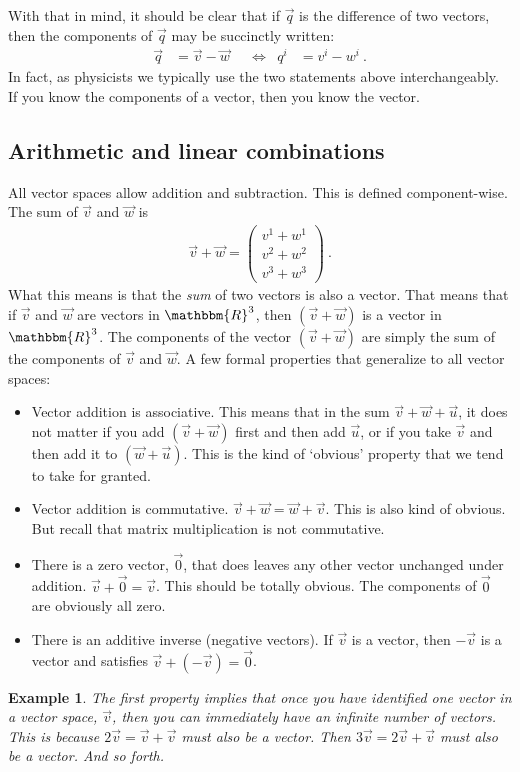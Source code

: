 \documentclass[12pt]{article}
\newtheorem{example}{Example}[section]
\begin{document}
With that in mind, it should be clear that if $\vec{q}$ is the difference of two vectors, then the components of $\vec{q}$ may be succinctly written:
\begin{align}
\vec{q} &= \vec{v}-\vec{w}    
&
&\Leftrightarrow
&
q^i &= v^i - w^i \ .
\end{align}
In fact, as physicists we typically use the two statements above interchangeably. If you know the components of a vector, then you know the vector.



\subsection{Arithmetic and linear combinations}

All vector spaces allow addition and subtraction. This is defined component-wise. The sum of $\vec{v}$ and $\vec{w}$ is
\begin{align}
    \vec{v}+\vec{w} = 
    \begin{pmatrix}
        v^1 + w^1\\
        v^2 + w^2\\
        v^3 + w^3
    \end{pmatrix} \ .
\end{align}
What this means is that the \emph{sum} of two vectors is also a vector. That means that if $\vec{v}$ and $\vec{w}$ are vectors in $\mathbbm{R}^3$, then $(\vec{v}+\vec{w})$ is a vector in $\mathbbm{R}^3$. The components of the vector $(\vec{v}+\vec{w})$ are simply the sum of the components of $\vec{v}$ and $\vec{w}$. 
% 
A few formal properties that generalize to all vector spaces:
\begin{itemize}
    \item Vector addition is associative. This means that in the sum $\vec{v}+\vec{w}+\vec{u}$, it does not matter if you add $(\vec{v}+\vec{w})$ first and then add $\vec{u}$, or if you take $\vec{v}$ and then add it to $(\vec{w}+\vec{u})$. This is the kind of `obvious' property that we tend to take for granted.
    \item Vector addition is commutative. $\vec{v}+\vec{w} = \vec{w}+\vec{v}$. This is also kind of obvious. But recall that matrix multiplication is not commutative.
    \item There is a zero vector, $\vec{0}$, that does leaves any other vector unchanged under addition. $\vec{v}+\vec{0} = \vec{v}$. This should be totally obvious. The components of $\vec{0}$ are obviously all zero.
    \item There is an additive inverse (negative vectors). If $\vec{v}$ is a vector, then $-\vec{v}$ is a vector and satisfies $\vec{v}+(-\vec{v}) = \vec{0}$.
\end{itemize}
\begin{example}
The first property implies that once you have identified one vector in a vector space, $\vec{v}$, then you can immediately have an infinite number of vectors. This is because $2\vec{v} = \vec{v}+\vec{v}$ must also be a vector. Then $3\vec{v} = 2\vec{v}+\vec{v}$ must also be a vector. And so forth.
\end{example}
\end{document}
